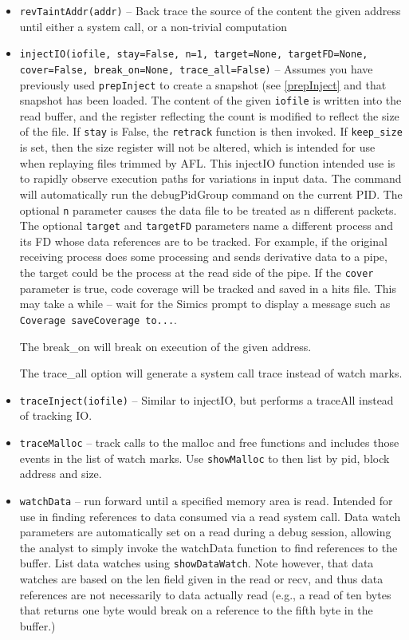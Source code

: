 \documentclass[titlepage]{article}
\begin{document}
\begin{itemize}
\item {\tt revTaintAddr(addr)} -- Back trace the source of the content the given address until either a system call, or a non-trivial computation

\item {\tt injectIO(iofile, stay=False, n=1, target=None, targetFD=None, cover=False, break\_on=None, trace\_all=False)} -- Assumes you have previously used {\tt prepInject}
to create a snapshot (see \ref{prepInject} and that snapshot has been loaded.
The content of the given {\tt iofile} is written into the read buffer, and the register reflecting 
the count is modified to reflect the size of the file.  If {\tt stay} is False, the {\tt retrack} function is then invoked. If {\tt keep\_size} is
set, then the size register will not be altered, which is intended for use when replaying files trimmed by AFL.
This injectIO function intended use is to rapidly observe execution paths for variations in input data. The command will automatically
run the debugPidGroup command on the current PID. The optional {\tt n} parameter causes the data file to be treated as n different packets.
The optional {\tt target} and {\tt targetFD} parameters name a different process and its FD whose data references are to be tracked.  For example,
if the original receiving process does some processing and sends derivative data to a pipe, the target could be the process at the read side
of the pipe.  If the {\tt cover} parameter is true, code coverage will be tracked and saved in a hits file.  This may take a while -- wait for the
Simics prompt to display a message such as {\tt Coverage saveCoverage to...}.

The break\_on will break on execution of the given address. 

The trace\_all option will generate a system call trace instead of watch marks.

\item {\tt traceInject(iofile)} -- Similar to injectIO, but performs a traceAll instead of tracking IO.

\item{\tt traceMalloc} -- track calls to the malloc and free functions and includes those events in the list of watch marks. Use {\tt showMalloc} to 
then list by pid, block address and size.

\item {\tt watchData} – run forward until a specified memory area is read.  Intended for use in finding references to data consumed via a read system call.  Data watch parameters are automatically set on a read during a debug session, allowing the analyst to simply invoke the watchData function to find references to the buffer.  List data watches using {\tt showDataWatch}.
Note however, that data watches are based on the len field given in the read or recv, and thus data references are not necessarily to data actually read (e.g., a read of ten bytes
that returns one byte would break on a reference to the fifth byte in the buffer.)

\end{itemize}
\end{document}

